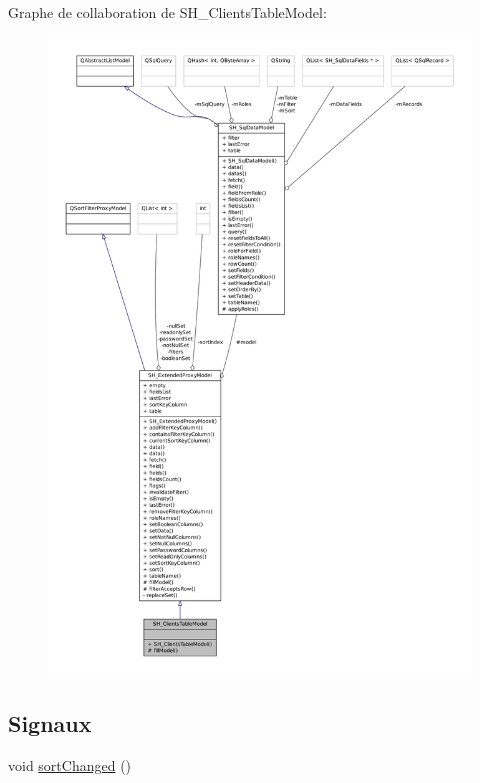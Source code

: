 Graphe de collaboration de S\-H\-\_\-\-Clients\-Table\-Model\-:
\nopagebreak
\begin{figure}[H]
\begin{center}
\leavevmode
\includegraphics[width=350pt]{classSH__ClientsTableModel__coll__graph}
\end{center}
\end{figure}
\subsection*{Signaux}
\begin{DoxyCompactItemize}
\item 
void \hyperlink{classSH__ExtendedProxyModel_a573590c2763d06d07c6509d4c91a06b2}{sort\-Changed} ()
\end{DoxyCompactItemize}
